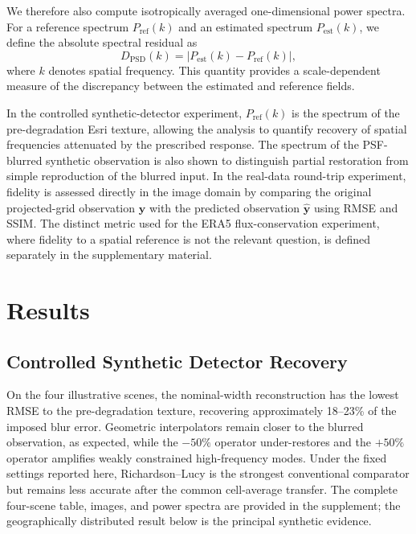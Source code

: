 \documentclass[journal]{IEEEtran}
\newcommand{\psf}{PSF\xspace}
\begin{document}
We therefore also compute isotropically averaged one-dimensional power spectra. For a reference spectrum $P_{\mathrm{ref}}(k)$ and an estimated spectrum $P_{\mathrm{est}}(k)$, we define the absolute spectral residual as
\begin{equation}
D_{\mathrm{PSD}}(k)
=
\left|
P_{\mathrm{est}}(k)-P_{\mathrm{ref}}(k)
\right|,
\label{eq:psd_residual}
\end{equation}
where $k$ denotes spatial frequency. This quantity provides a scale-dependent measure of the discrepancy between the estimated and reference fields.

In the controlled synthetic-detector experiment, $P_{\mathrm{ref}}(k)$ is the spectrum of the pre-degradation Esri texture, allowing the analysis to quantify recovery of spatial frequencies attenuated by the prescribed response. The spectrum of the \psf-blurred synthetic observation is also shown to distinguish partial restoration from simple reproduction of the blurred input. In the real-data round-trip experiment, fidelity is assessed directly in the image domain by comparing the original projected-grid observation $\mathbf{y}$ with the predicted observation $\widehat{\mathbf{y}}$ using RMSE and SSIM. The distinct metric used for the ERA5 flux-conservation experiment, where fidelity to a spatial reference is not the relevant question, is defined separately in the supplementary material.

\section{Results}

\subsection{Controlled Synthetic Detector Recovery}
\label{sec:synthetic_results}

On the four illustrative scenes, the nominal-width
reconstruction has the lowest RMSE to the pre-degradation texture, recovering
approximately 18--23\% of the imposed blur error. Geometric interpolators
remain closer to the blurred observation, as expected, while the $-50\%$
operator under-restores and the $+50\%$ operator amplifies weakly constrained
high-frequency modes. Under the fixed settings reported here,
Richardson--Lucy is the strongest conventional comparator but remains less
accurate after the common cell-average transfer. The complete four-scene
table, images, and power spectra are provided in the supplement; the
geographically distributed result below is the principal synthetic evidence.
\end{document}
